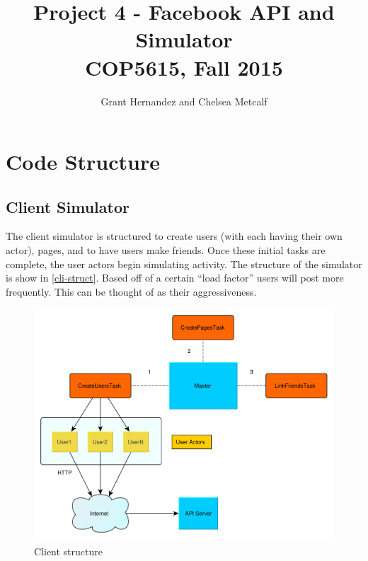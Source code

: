 \documentclass{article}
\begin{document}
\title{Project 4 - Facebook API and Simulator \\ COP5615, Fall 2015}
 
\author{Grant Hernandez and Chelsea Metcalf}
 
\maketitle %
 
\section*{Code Structure}

\subsection*{Client Simulator}

The client simulator is structured to create users (with each having their own actor), pages, and to have users make friends. Once these initial tasks are complete, the user actors begin simulating activity. The structure of the simulator is show in \autoref{cli-struct}. Based off of a certain ``load factor'' users will post more frequently. This can be thought of as their aggressiveness.

\begin{figure}[H]
  \centering
  \includegraphics[scale=0.5]{diagrams/client-structure.pdf}
  \caption{Client structure}
  \label{cli-struct}
\end{figure}
\end{document}
